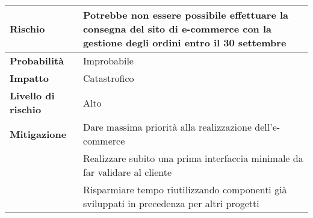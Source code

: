 \begin{table}[H]
  \begin{tabularx}{\textwidth}{lX}
    \toprule
    \textbf{Rischio}            & \textbf{Potrebbe non essere possibile effettuare la consegna del sito di e-commerce con la gestione degli ordini entro il 30 settembre} \\
    \midrule
    \textbf{Probabilità}        & Improbabile                                                                                                                             \\
    \textbf{Impatto}            & Catastrofico                                                                                                                            \\
    \textbf{Livello di rischio} & Alto                                                                                                                                    \\
    \textbf{Mitigazione}        & Dare massima priorità alla realizzazione dell'e-commerce                                                                                \\
                                & Realizzare subito una prima interfaccia minimale da far validare al cliente                                                             \\
                                & Risparmiare tempo riutilizzando componenti già sviluppati in precedenza per altri progetti                                              \\
    \bottomrule
  \end{tabularx}
\end{table}

